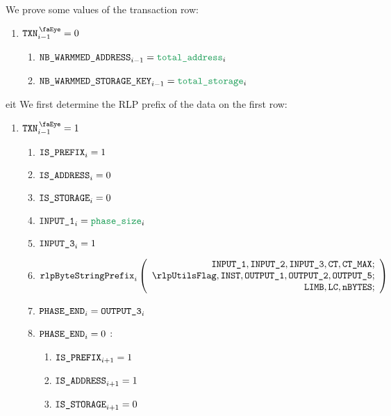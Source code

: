 We prove some values of the transaction row:
\begin{enumerate}[resume]
	\item \If $\isTxn_{i-1}=0$ \Then
		\begin{enumerate}
			\item $\nbWarmedAddress_{i-1} = \locTotNbOfAddress_{i}$
			\item $\nbWarmedStorageKey_{i-1} = \locTotNbOfStorage_{i}$ 
		\end{enumerate}
\end{enumerate}
eit
We first determine the RLP prefix of the data on the first row:
\begin{enumerate}[resume]
	\item \If $\isTxn_{i-1}=1$ \Then
		\begin{enumerate}
			\item $\texttt{IS\_PREFIX} _{i} = 1$
			\item $\texttt{IS\_ADDRESS}   _{i} = 0$
			\item $\texttt{IS\_STORAGE}    _{i} = 0$
			\item $\inputColumn{1}_{i} = \locPhaseSize_{i}$
			\item $\texttt{INPUT\_3}_{i} = 1$ 
			\item 
				\[
					\rlpBytestringPrefix_{i}
					\left(
					\begin{array}{r}
						\inputColumn{1},
						\inputColumn{2},
						\inputColumn{3},
						\ct,
						\maxCt; \\
						\rlpUtilsFlag,
						\INST,
						\outputColumn{1},
						\outputColumn{2},
						\outputColumn{5}; \\
						\limb,
						\lc,
						\limbsize; \\
					\end{array}
					\right)
				\]
			\item $\texttt{PHASE\_END}_{i} = \texttt{OUTPUT\_3}_{i}$
			\item \If $\texttt{PHASE\_END}_{i} =0$ \Then:
				\begin{enumerate}
					\item $\texttt{IS\_PREFIX} _{i+1} = 1$
					\item $\texttt{IS\_ADDRESS}   _{i+1} = 1$
					\item $\texttt{IS\_STORAGE}    _{i+1} = 0$
				\end{enumerate}
		\end{enumerate}
\end{enumerate}

